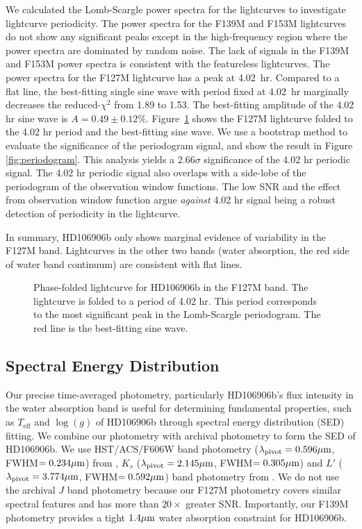 \documentclass[twocolumn, trackchanges]{aastex62}
\newcommand{\teff}{\ensuremath{T_{\mathrm{eff}}}\xspace}
\newcommand{\logg}{\ensuremath{\log(g)}\xspace}
\begin{document}
We calculated the Lomb-Scargle power spectra \citep[][Figure~\ref{fig:periodogram}]{Lomb1976} for the lightcurves to investigate lightcurve periodicity. The power spectra for the F139M and F153M lightcurves do not show any significant peaks except in the high-frequency region where the power spectra are dominated by random noise. The lack of signals in the F139M and F153M power spectra is consistent with the featureless lightcurves. The power spectra for the F127M lightcurve has a peak at 4.02~hr. Compared to a flat line, the best-fitting single sine wave with period fixed at 4.02~hr marginally decreases the reduced-$\chi^{2}$ from 1.89 to 1.53. The best-fitting amplitude of the 4.02 hr sine wave is $A = 0.49\pm0.12\%$. Figure~\ref{fig:fold} shows the F127M lightcurve folded to the 4.02 hr period and the best-fitting sine wave. We use a bootstrap method \citep{Manjavacas2017,Zhou2019} to evaluate the significance of the periodogram signal, and show the result in Figure \ref{fig:periodogram}. This analysis yields a $2.66\sigma$ significance of the 4.02 hr periodic signal. The 4.02 hr periodic signal also overlaps with a side-lobe of the periodogram of the observation window functions. The low SNR and the effect from observation window function argue \emph{against} 4.02 hr signal being a robust detection of periodicity in the lightcurve.

In summary, HD106906b only shows marginal  evidence of variability in the F127M band. Lightcurves in the other two bands (water absorption, the red side of water band continuum) are consistent with flat lines.

\begin{figure}[t]
  \centering
  \caption{Phase-folded lightcurve for HD106906b in the F127M band. The lightcurve is folded to a period of 4.02 hr. This period corresponds to the most significant peak in the Lomb-Scargle periodogram. The red line is the best-fitting sine wave.}
  \label{fig:fold}
\end{figure}

\subsection{Spectral Energy Distribution}
Our precise time-averaged photometry, particularly HD\-106906b's flux intensity in the water absorption band is useful for determining fundamental properties, such as \teff{} and \logg{} of HD106906b through spectral energy distribution (SED) fitting.  We combine our photometry with archival photometry to form the SED of HD106906b.  We use HST/ACS/F606W band photometry ($\lambda_{\mathrm{pivot}}=0.596\mbox{$\mu$m}$, FWHM$=0.234\mbox{$\mu$m}$) from \citet{Kalas2015}, $K_{s}$ ($\lambda_{\mathrm{pivot}}=2.145\mbox{$\mu$m}$, FWHM$=0.305\mbox{$\mu$m}$) and $L'$ ($\lambda_{\mathrm{pivot}}=3.774\mbox{$\mu$m}$, FWHM$=0.592\mbox{$\mu$m}$) band photometry from \citet{Bailey2013}. We do not use the archival $J$ band photometry \citep{Wu2016} because our F127M photometry covers similar spectral features and has more than $20\times$ greater SNR. Importantly, our F139M photometry provides a tight $1.4\mbox{$\mu$m}$ water absorption constraint for HD106906b.
\end{document}
